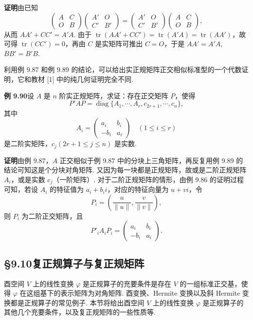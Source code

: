 \documentclass[UTF8, 12pt, fontset=fandol, oneside]{ctexart}
\begin{document}
\noindent\textbf{证明}\quad 由已知
\[
\begin{pmatrix}
A&C\\
O&B
\end{pmatrix}
\begin{pmatrix}
A'&O\\
C'&B'
\end{pmatrix}
=
\begin{pmatrix}
A'&O\\
C'&B'
\end{pmatrix}
\begin{pmatrix}
A&C\\
O&B
\end{pmatrix},
\]
从而 $AA'+CC'=A'A$. 由于 $\operatorname{tr}(AA'+CC')=\operatorname{tr}(A'A)=\operatorname{tr}(AA')$，故可得 $\operatorname{tr}(CC')=0$，再由 $C$ 是实矩阵可推出 $C=O$，于是 $AA'=A'A$, $BB'=B'B$.

利用例 9.87 和例 9.89 的结论，可以给出实正规矩阵正交相似标准型的一个代数证明，它和教材 [1] 中的纯几何证明完全不同.

\noindent\textbf{例 9.90}\quad 设 $A$ 是 $n$ 阶实正规矩阵，求证：存在正交矩阵 $P$，使得
\[
P'AP=\operatorname{diag}\{A_1,\cdots,A_r,c_{2r+1},\cdots,c_n\},
\]
其中
\[
A_i=\begin{pmatrix}
a_i&b_i\\
-b_i&a_i
\end{pmatrix}\quad (1\le i\le r)
\]
是二阶实矩阵，$c_j(2r+1\le j\le n)$ 是实数.

\noindent\textbf{证明}\quad 由例 9.87，$A$ 正交相似于例 9.87 中的分块上三角矩阵，再反复用例 9.89 的结论可知这是个分块对角矩阵. 又因为每一块都是正规矩阵，故或是二阶正规矩阵 $A_i$，或是实数 $c_j$（一阶矩阵）. 对于二阶正规矩阵的情形，由例 9.86 的证明过程可知，若设 $A_i$ 的特征值为 $a_i+b_ii$，对应的特征向量为 $u+vi$，令
\[
P_i=\left(\frac{u}{\|u\|},\frac{v}{\|v\|}\right),
\]
则 $P_i$ 为二阶正交矩阵，且
\[
P'_iA_iP_i=\begin{pmatrix}
a_i&b_i\\
-b_i&a_i
\end{pmatrix}.
\]

\subsection*{§9.10\quad 复正规算子与复正规矩阵}

酉空间 $V$ 上的线性变换 $\varphi$ 是正规算子的充要条件是存在 $V$ 的一组标准正交基，使得 $\varphi$ 在这组基下的表示矩阵为对角矩阵. 酉变换、Hermite 变换以及斜 Hermite 变换都是正规算子的常见例子. 本节将给出酉空间 $V$ 上的线性变换 $\varphi$ 是正规算子的其他几个充要条件，以及复正规矩阵的一些性质等.
\end{document}
